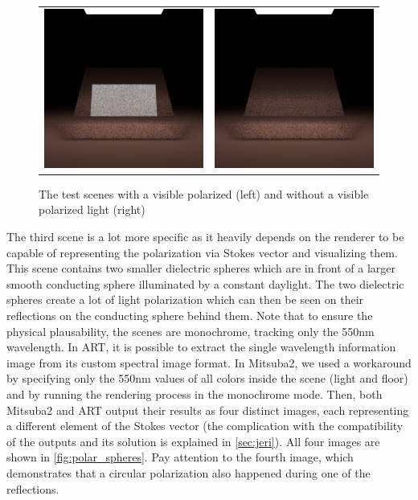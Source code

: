 \begin{figure}[h]
	\begin{tabular}{cc}
		\includegraphics[width=.45\linewidth]{img/polarizing_plane_90.png}
		&
		\includegraphics[width=.45\linewidth]{img/polarizing_plane_0.png}
	\end{tabular}
	\caption{The test scenes with a visible polarized (left) and without a visible polarized light (right)}
	\label{fig:polar_planes}
\end{figure}

The third scene is a lot more specific as it heavily depends on the renderer to be capable of representing the polarization via Stokes vector and visualizing them. This scene contains two smaller dielectric spheres which are in front of a larger smooth conducting sphere illuminated by a constant daylight. The two dielectric spheres create a lot of light polarization which can then be seen on their reflections on the conducting sphere behind them. Note that to ensure the physical plausability, the scenes are monochrome, tracking only the 550nm wavelength. In ART, it is possible to extract the single wavelength information image from its custom spectral image format. In Mitsuba2, we used a workaround by specifying only the 550nm values of all colors inside the scene (light and floor) and by running the rendering process in the monochrome mode. Then, both Mitsuba2 and ART output their results as four distinct images, each representing a different element of the Stokes vector (the complication with the compatibility of the outputs and its solution is explained in \autoref{sec:jeri}). All four images are shown in \autoref{fig:polar_spheres}. Pay attention to the fourth image, which demonstrates that a circular polarization also happened during one of the reflections.


